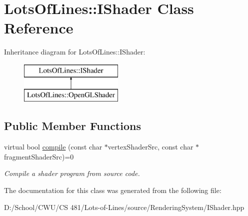 \hypertarget{class_lots_of_lines_1_1_i_shader}{}\section{Lots\+Of\+Lines\+:\+:I\+Shader Class Reference}
\label{class_lots_of_lines_1_1_i_shader}
Inheritance diagram for Lots\+Of\+Lines\+:\+:I\+Shader\+:\begin{figure}[H]
\begin{center}
\leavevmode
\includegraphics[height=2.000000cm]{class_lots_of_lines_1_1_i_shader}
\end{center}
\end{figure}
\subsection*{Public Member Functions}
\begin{DoxyCompactItemize}
\item 
virtual bool \hyperlink{class_lots_of_lines_1_1_i_shader_ae36eff82b2940ff5d16b938bb67edd2b}{compile} (const char $\ast$vertex\+Shader\+Src, const char $\ast$fragment\+Shader\+Src)=0\hypertarget{class_lots_of_lines_1_1_i_shader_ae36eff82b2940ff5d16b938bb67edd2b}{}\label{class_lots_of_lines_1_1_i_shader_ae36eff82b2940ff5d16b938bb67edd2b}

\begin{DoxyCompactList}\small\item\em Compile a shader program from source code. \end{DoxyCompactList}\end{DoxyCompactItemize}


The documentation for this class was generated from the following file\+:\begin{DoxyCompactItemize}
\item 
D\+:/\+School/\+C\+W\+U/\+C\+S 481/\+Lots-\/of-\/\+Lines/source/\+Rendering\+System/I\+Shader.\+hpp\end{DoxyCompactItemize}
